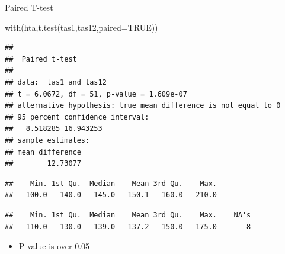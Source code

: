 \documentclass[
  ignorenonframetext,
]{beamer}
\newenvironment{Shaded}{\begin{snugshade}}{\end{snugshade}}
\newcommand{\AttributeTok}[1]{\textcolor[rgb]{0.77,0.63,0.00}{#1}}
\newcommand{\ConstantTok}[1]{\textcolor[rgb]{0.00,0.00,0.00}{#1}}
\newcommand{\FunctionTok}[1]{\textcolor[rgb]{0.00,0.00,0.00}{#1}}
\newcommand{\NormalTok}[1]{#1}
\newcommand{\SpecialCharTok}[1]{\textcolor[rgb]{0.00,0.00,0.00}{#1}}
\providecommand{\tightlist}{%
  \setlength{\itemsep}{0pt}\setlength{\parskip}{0pt}}
\begin{document}
\begin{frame}[fragile]{Paired T-test}
\protect\hypertarget{paired-t-test}{}
\small

\begin{Shaded}
\begin{Highlighting}[]
\FunctionTok{with}\NormalTok{(hta,}\FunctionTok{t.test}\NormalTok{(tas1,tas12,}\AttributeTok{paired=}\ConstantTok{TRUE}\NormalTok{))}
\end{Highlighting}
\end{Shaded}

\begin{verbatim}
## 
##  Paired t-test
## 
## data:  tas1 and tas12
## t = 6.0672, df = 51, p-value = 1.609e-07
## alternative hypothesis: true mean difference is not equal to 0
## 95 percent confidence interval:
##   8.518285 16.943253
## sample estimates:
## mean difference 
##        12.73077
\end{verbatim}

\begin{Shaded}
\end{Shaded}

\begin{verbatim}
##    Min. 1st Qu.  Median    Mean 3rd Qu.    Max. 
##   100.0   140.0   145.0   150.1   160.0   210.0
\end{verbatim}

\begin{Shaded}
\end{Shaded}

\begin{verbatim}
##    Min. 1st Qu.  Median    Mean 3rd Qu.    Max.    NA's 
##   110.0   130.0   139.0   137.2   150.0   175.0       8
\end{verbatim}

\begin{itemize}
\tightlist
\item
  P value is over 0.05
\end{itemize}
\end{frame}
\end{document}
